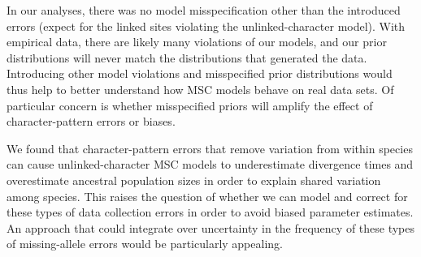 In our analyses, there was no model misspecification other than the introduced
errors (expect for the linked sites violating the unlinked-character model).
With empirical data, there are likely many violations of our models,
and our prior distributions will never match the distributions that generated
the data.
Introducing other model violations and misspecified prior distributions
would thus help to better understand how MSC models behave on real
data sets.
Of particular concern is whether misspecified priors will amplify the effect of
character-pattern errors or biases.

We found that character-pattern errors that remove variation from within
species can cause unlinked-character MSC models to underestimate divergence
times and overestimate ancestral population sizes in order to explain shared
variation among species.
This raises the question of whether we can model and correct for these types of
data collection errors in order to avoid biased parameter estimates.
An approach that could integrate over uncertainty in the frequency of these
types of missing-allele errors would be particularly appealing.




